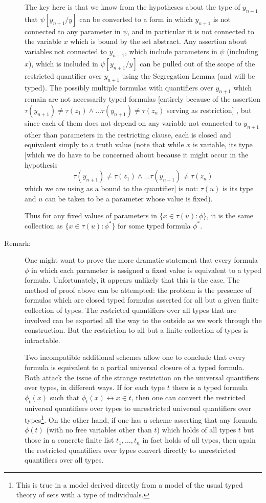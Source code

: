\documentclass[12pt]{article}
\begin{document}
\begin{description}
The key here is that we know from the hypotheses about the type of $y_{n+1}$ that $\psi[y_{n+1}/y]$ can be converted
to a form in which $y_{n+1}$ is not connected to any parameter in $\psi$, and in particular it is not connected to the variable
$x$ which is bound by the set abstract.  Any assertion about variables not connected to $y_{n+1}$, which include parameters in $\psi$ (including $x$),  which is included in
$\psi[y_{n+1}/y]$ can be pulled out of the scope of the restricted quantifier over $y_{n+1}$ using the Segregation Lemma (and will be typed).  The possibly multiple formulas with quantifiers over $y_{n+1}$ which remain are not necessarily  typed formulas [entirely because of the assertion $\tau(y_{n+1}) \neq \tau(z_1) \wedge \ldots \tau(y_{n+1}) \neq \tau(z_n)$ serving as restriction]  , but  since each of them does not depend on any variable not connected to $y_{n+1}$ other than parameters in the restricting clause, each is closed and equivalent simply to a truth value (note that while $x$ is variable,
its type [which we do have to be concerned about because it might occur in the hypothesis $$\tau(y_{n+1}) \neq \tau(z_1) \wedge \ldots \tau(y_{n+1}) \neq \tau(z_n)$$ which we are using as a bound to the quantifier] is not:  $\tau(u)$ is its type and $u$ can be taken to be a parameter whose value is fixed).

Thus for any fixed values of parameters in $\{x \in \tau(u):\phi\}$, it is the same collection as $\{x \in \tau(u):\phi^*\}$ for some typed formula $\phi^*$.

\item[Remark:]  One might want to prove the more dramatic statement that every formula $\phi$ in which each parameter is assigned a fixed value is equivalent to a typed formula.  Unfortunately, it appears unlikely that this is the case.  The method of proof above can be attempted:  the problem is the presence of formulas
which are closed typed formulas asserted for all but a given finite collection of types.  The restricted quantifiers over all types that are involved can be exported all the way to the outside as we work through the construction.  But the restriction to all but a finite collection of types is intractable.

Two incompatible additional schemes allow one to conclude that every formula is equivalent to a partial universal closure of a typed formula.  Both attack the
issue of the strange restriction on the universal quantifiers over types, in different ways.  If for each type $t$ there is a typed formula $\phi_t(x)$ such that $\phi_t(x) \leftrightarrow x \in t$, then one can convert the restricted universal quantifiers over types to unrestricted universal quantifiers over types\footnote{This is true in a model derived directly from a model of the usual typed theory of sets with a type of individuals.}.  On the other hand,
if one has a scheme asserting that any formula $\phi(t)$ (with no free variables other than $t$) which holds of all types $t$ but those in a concrete finite list $t_1,\ldots,t_n$ in fact holds of all types,
then again the restricted quantifiers over types convert directly to unrestricted quantifiers over all types.


\end{description}
\end{document}
